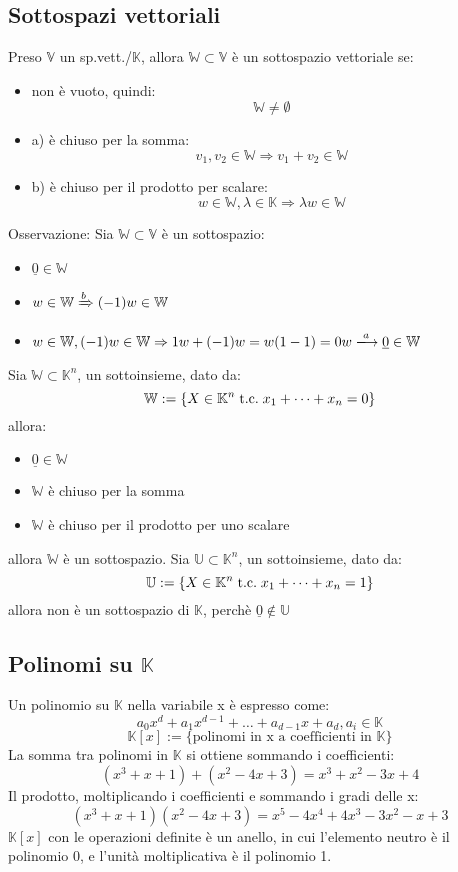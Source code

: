 \documentclass[a4paper,12pt]{article}
\begin{document}
	\subsection{Sottospazi vettoriali}
	Preso $\mathbb{V}$ un sp.vett./$\mathbb{K}$, allora $\mathbb{W} \subset \mathbb{V}$ è un sottospazio vettoriale se:
	\begin{itemize}
		\item non è vuoto, quindi:
		\[\mathbb{W} \not = \emptyset\]
		\item a) è chiuso per la somma:
		\[v_1, v_2 \in \mathbb{W} \Rightarrow v_1 + v_2 \in \mathbb{W}\]
		\item b) è chiuso per il prodotto per scalare:
		\[w \in \mathbb{W}, \lambda \in \mathbb{K} \Rightarrow \lambda w \in \mathbb{W}\]
	\end{itemize}
	Osservazione: Sia $\mathbb{W} \subset \mathbb{V}$ è un sottospazio:
	\begin{itemize}
		\item $\underline{0} \in \mathbb{W}$
		\item $w \in \mathbb{W} \xRightarrow {b} (-1)w \in \mathbb{W}$
		\item $w \in \mathbb{W}, (-1)w \in \mathbb{W} \Rightarrow 1w + (-1)w = w(1 - 1) = 0w \xlongrightarrow{a} \underline{0} \in \mathbb{W}$
	\end{itemize}
	Sia $\mathbb{W} \subset \mathbb{K}^n$, un sottoinsieme, dato da:
	\[\mathbb{W} := \{X \in \mathbb{K}^n \;\text{t.c.}\; x_1 + \dots + x_n = 0\}\]
	allora:
	\begin{itemize}
		\item $\underline{0} \in \mathbb{W}$
		\item $\mathbb{W}$ è chiuso per la somma
		\item $\mathbb{W}$ è chiuso per il prodotto per uno scalare
	\end{itemize}
	allora $\mathbb{W}$ è un sottospazio. \newline	
	Sia $\mathbb{U} \subset \mathbb{K}^n$, un sottoinsieme, dato da:
	\[\mathbb{U} := \{X \in \mathbb{K}^n \;\text{t.c.}\; x_1 + \dots + x_n = 1\}\]
	allora non è un sottospazio di $\mathbb{K}$, perchè $\underline{0} \not \in \mathbb{U}$
	
	\subsection{Polinomi su $\mathbb{K}$}
	Un polinomio su $\mathbb{K}$ nella variabile x è espresso come:
	\[a_0x^d + a_1 x^{d -1} + \dots + a_{d -1} x + a_d, a_i \in \mathbb{K}\]
	\[\mathbb{K}[x] := \{\text{polinomi in x a coefficienti in } \mathbb{K}\}\]
	La somma tra polinomi in $\mathbb{K}$ si ottiene sommando i coefficienti:
	\[(x^3 + x +1) + (x^2 - 4x + 3) = x^3 + x^2 -3x + 4\]
	Il prodotto, moltiplicando i coefficienti e sommando i gradi delle x:
	\[(x^3 + x +1)(x^2 - 4x + 3) = x^5 -4x^4 + 4x^3 -3x^2 -x + 3\]
	$\mathbb{K}[x]$ con le operazioni definite è un anello, in cui l'elemento neutro è il polinomio 0, e l'unità moltiplicativa è il polinomio 1.
	
\end{document}
